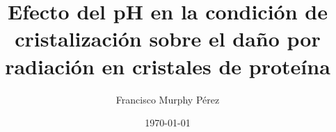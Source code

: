 \documentclass[
	a4paper, %
	fontsize=10pt, %
    twoside=true, %
	numbers=noenddot, %
]{kaobook}
\begin{document}


\title[Efecto del pH en el daño por radiación]{Efecto del pH en la condición de cristalización sobre el daño por radiación en cristales de proteína}

\author[FMP]{Francisco Murphy Pérez}

\date{\today}



\frontmatter %




\makeatletter
\end{document}
